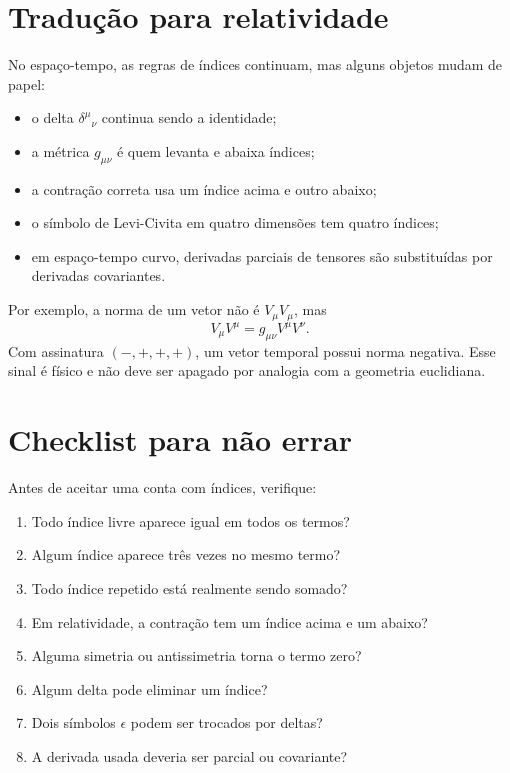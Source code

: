 \documentclass[12pt,a4paper,oneside]{book}
\theoremstyle{rgplain}
\theoremstyle{rgremark}
\begin{document}
\section{Tradução para relatividade}

No espaço-tempo, as regras de índices continuam, mas alguns objetos mudam de
papel:

\begin{itemize}
  \item o delta $\delta^\mu{}_\nu$ continua sendo a identidade;
  \item a métrica $g_{\mu\nu}$ é quem levanta e abaixa índices;
  \item a contração correta usa um índice acima e outro abaixo;
  \item o símbolo de Levi-Civita em quatro dimensões tem quatro índices;
  \item em espaço-tempo curvo, derivadas parciais de tensores são substituídas
  por derivadas covariantes.
\end{itemize}

Por exemplo, a norma de um vetor não é $V_\mu V_\mu$, mas
\[
  V_\mu V^\mu=g_{\mu\nu}V^\mu V^\nu.
\]
Com assinatura $(-,+,+,+)$, um vetor temporal possui norma negativa. Esse sinal
é físico e não deve ser apagado por analogia com a geometria euclidiana.

\section{Checklist para não errar}

Antes de aceitar uma conta com índices, verifique:

\begin{enumerate}
  \item Todo índice livre aparece igual em todos os termos?
  \item Algum índice aparece três vezes no mesmo termo?
  \item Todo índice repetido está realmente sendo somado?
  \item Em relatividade, a contração tem um índice acima e um abaixo?
  \item Alguma simetria ou antissimetria torna o termo zero?
  \item Algum delta pode eliminar um índice?
  \item Dois símbolos $\epsilon$ podem ser trocados por deltas?
  \item A derivada usada deveria ser parcial ou covariante?
\end{enumerate}
\end{document}
